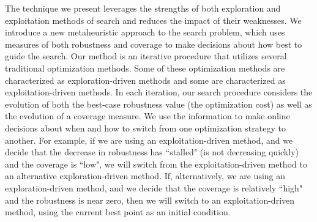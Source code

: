 The technique we present leverages the strengths of both exploration and exploitation methods of search and reduces the impact of their weaknesses.
We introduce a new metaheuristic approach to the search problem, which uses measures of both robustness and coverage to make decisions about how best to guide the search.
Our method is an iterative procedure that utilizes several traditional optimization methods.
Some of these optimization methods are characterized as exploration-driven methods and some are characterized as exploitation-driven methods.  
In each iteration, our search procedure considers the evolution of both the best-case robustness value (the optimization cost) as well as the evolution of a coverage measure.
We use the information to make online decisions about when and how to switch from one optimization strategy to another. 
For example, if we are using an exploitation-driven method, and we decide that the decrease in robustness has ``stalled" (is not decreasing quickly) and the coverage is ``low", we will switch from the exploitation-driven method to an alternative exploration-driven method.
If, alternatively, we are using an exploration-driven method, and we decide that the coverage is relatively ``high" and the robustness is near zero, then we will switch to an exploitation-driven method, using the current best point as an initial condition.
 


